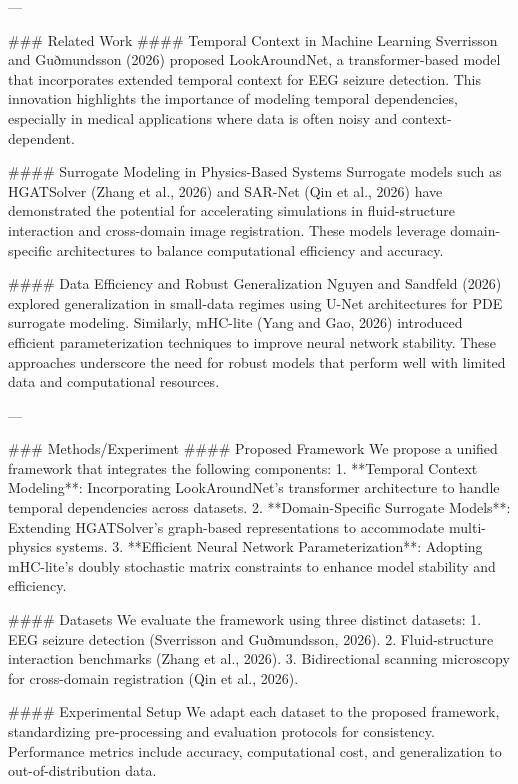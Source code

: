 ---

### Related Work  
#### Temporal Context in Machine Learning  
Sverrisson and Guðmundsson (2026) proposed LookAroundNet, a transformer-based model that incorporates extended temporal context for EEG seizure detection. This innovation highlights the importance of modeling temporal dependencies, especially in medical applications where data is often noisy and context-dependent.

#### Surrogate Modeling in Physics-Based Systems  
Surrogate models such as HGATSolver (Zhang et al., 2026) and SAR-Net (Qin et al., 2026) have demonstrated the potential for accelerating simulations in fluid-structure interaction and cross-domain image registration. These models leverage domain-specific architectures to balance computational efficiency and accuracy. 

#### Data Efficiency and Robust Generalization  
Nguyen and Sandfeld (2026) explored generalization in small-data regimes using U-Net architectures for PDE surrogate modeling. Similarly, mHC-lite (Yang and Gao, 2026) introduced efficient parameterization techniques to improve neural network stability. These approaches underscore the need for robust models that perform well with limited data and computational resources.

---

### Methods/Experiment  
#### Proposed Framework  
We propose a unified framework that integrates the following components:  
1. **Temporal Context Modeling**: Incorporating LookAroundNet's transformer architecture to handle temporal dependencies across datasets.  
2. **Domain-Specific Surrogate Models**: Extending HGATSolver's graph-based representations to accommodate multi-physics systems.  
3. **Efficient Neural Network Parameterization**: Adopting mHC-lite's doubly stochastic matrix constraints to enhance model stability and efficiency.  

#### Datasets  
We evaluate the framework using three distinct datasets:  
1. EEG seizure detection (Sverrisson and Guðmundsson, 2026).  
2. Fluid-structure interaction benchmarks (Zhang et al., 2026).  
3. Bidirectional scanning microscopy for cross-domain registration (Qin et al., 2026).  

#### Experimental Setup  
We adapt each dataset to the proposed framework, standardizing pre-processing and evaluation protocols for consistency. Performance metrics include accuracy, computational cost, and generalization to out-of-distribution data.

